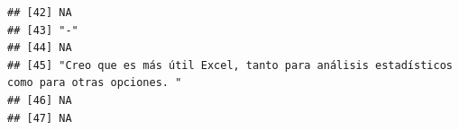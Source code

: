 \documentclass[
]{article}
\begin{document}
\begin{verbatim}
## [42] NA                                                                                                                                                                                                                                                                                                                                                                                                       
## [43] "-"                                                                                                                                                                                                                                                                                                                                                                                                      
## [44] NA                                                                                                                                                                                                                                                                                                                                                                                                       
## [45] "Creo que es más útil Excel, tanto para análisis estadísticos como para otras opciones. "                                                                                                                                                                                                                                                                                                                
## [46] NA                                                                                                                                                                                                                                                                                                                                                                                                       
## [47] NA
\end{verbatim}
\end{document}
